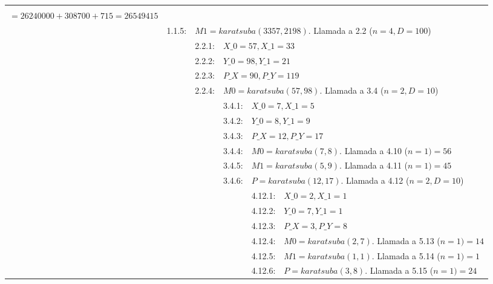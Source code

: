 \documentclass[titlepage,a4paper]{article}
\begin{document}
\begin{longtable}[r]{lllllll}
{\begin{tabular}{l}
$\leftarrow 2624\times 10^4 + (6426-2624-715)\times 100 + 715 =$ \\
$=  26240000 + 308700 + 715 = \boxed{26549415}$
\end{tabular}
}     \\
     & 1.1.5:     & \multicolumn{5}{l}{$M1=karatsuba(3357,2198)$. Llamada a 2.2 ($n=4,D=100$)}     \\
\multicolumn{2}{l}{}     & 2.2.1:     & \multicolumn{4}{l}{$X\_0=57, X\_1=33$}     \\
\multicolumn{2}{l}{}     & 2.2.2:     & \multicolumn{4}{l}{$Y\_0=98, Y\_1=21$}     \\
\multicolumn{2}{l}{}     & 2.2.3:     & \multicolumn{4}{l}{$P\_X=90, P\_Y=119$}     \\
\multicolumn{2}{l}{}     & 2.2.4:     & \multicolumn{4}{l}{$M0=karatsuba(57,98)$. Llamada a 3.4 ($n=2,D=10$)}     \\
\multicolumn{3}{l}{}     & 3.4.1:     & \multicolumn{3}{l}{$X\_0=7, X\_1=5$}     \\
\multicolumn{3}{l}{}     & 3.4.2:     & \multicolumn{3}{l}{$Y\_0=8, Y\_1=9$}     \\
\multicolumn{3}{l}{}     & 3.4.3:     & \multicolumn{3}{l}{$P\_X=12, P\_Y=17$}     \\
\multicolumn{3}{l}{}     & 3.4.4:     & \multicolumn{3}{l}{$M0=karatsuba(7,8)$. Llamada a 4.10 ($n=1) = \boxed{56}$}     \\
\multicolumn{3}{l}{}     & 3.4.5:     & \multicolumn{3}{l}{$M1=karatsuba(5,9)$. Llamada a 4.11 ($n=1) = \boxed{45}$}     \\
\multicolumn{3}{l}{}     & 3.4.6:     & \multicolumn{3}{l}{$P=karatsuba(12,17)$. Llamada a 4.12 ($n=2,D=10$)}     \\
\multicolumn{4}{l}{}     & 4.12.1:     & \multicolumn{2}{l}{$X\_0=2, X\_1=1$}     \\
\multicolumn{4}{l}{}     & 4.12.2:     & \multicolumn{2}{l}{$Y\_0=7, Y\_1=1$}     \\
\multicolumn{4}{l}{}     & 4.12.3:     & \multicolumn{2}{l}{$P\_X=3, P\_Y=8$}     \\
\multicolumn{4}{l}{}     & 4.12.4:     & \multicolumn{2}{l}{$M0=karatsuba(2,7)$. Llamada a 5.13 ($n=1) = \boxed{14}$}     \\
\multicolumn{4}{l}{}     & 4.12.5:     & \multicolumn{2}{l}{$M1=karatsuba(1,1)$. Llamada a 5.14 ($n=1) = \boxed{1}$}     \\
\multicolumn{4}{l}{}     & 4.12.6:     & \multicolumn{2}{l}{$P=karatsuba(3,8)$. Llamada a 5.15 ($n=1) = \boxed{24}$}     \\

\end{longtable}
\end{document}
